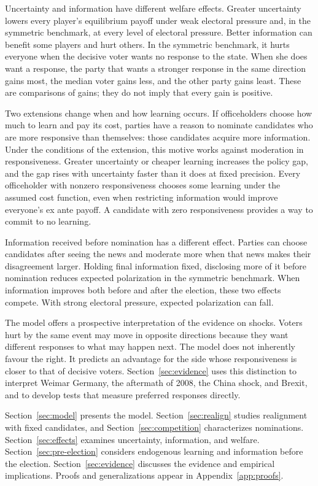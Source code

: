 \documentclass[12pt,letterpaper]{article}
\begin{document}
Uncertainty and information have different welfare effects. Greater uncertainty lowers every player's equilibrium payoff under weak electoral pressure and, in the symmetric benchmark, at every level of electoral pressure. Better information can benefit some players and hurt others. In the symmetric benchmark, it hurts everyone when the decisive voter wants no response to the state. When she does want a response, the party that wants a stronger response in the same direction gains most, the median voter gains less, and the other party gains least. These are comparisons of gains; they do not imply that every gain is positive.

Two extensions change when and how learning occurs. If officeholders choose how much to learn and pay its cost, parties have a reason to nominate candidates who are more responsive than themselves: those candidates acquire more information. Under the conditions of the extension, this motive works against moderation in responsiveness. Greater uncertainty or cheaper learning increases the policy gap, and the gap rises with uncertainty faster than it does at fixed precision. Every officeholder with nonzero responsiveness chooses some learning under the assumed cost function, even when restricting information would improve everyone's ex ante payoff. A candidate with zero responsiveness provides a way to commit to no learning.

Information received before nomination has a different effect. Parties can choose candidates after seeing the news and moderate more when that news makes their disagreement larger. Holding final information fixed, disclosing more of it before nomination reduces expected polarization in the symmetric benchmark. When information improves both before and after the election, these two effects compete. With strong electoral pressure, expected polarization can fall.

The model offers a prospective interpretation of the evidence on shocks. Voters hurt by the same event may move in opposite directions because they want different responses to what may happen next. The model does not inherently favour the right. It predicts an advantage for the side whose responsiveness is closer to that of decisive voters. Section~\ref{sec:evidence} uses this distinction to interpret Weimar Germany, the aftermath of 2008, the China shock, and Brexit, and to develop tests that measure preferred responses directly.

Section~\ref{sec:model} presents the model. Section~\ref{sec:realign} studies realignment with fixed candidates, and Section~\ref{sec:competition} characterizes nominations. Section~\ref{sec:effects} examines uncertainty, information, and welfare. Section~\ref{sec:pre-election} considers endogenous learning and information before the election. Section~\ref{sec:evidence} discusses the evidence and empirical implications. Proofs and generalizations appear in Appendix~\ref{app:proofs}.
\end{document}
